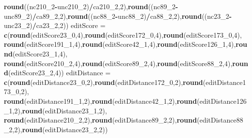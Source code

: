 \documentclass[
]{article}
\newenvironment{Shaded}{\begin{snugshade}}{\end{snugshade}}
\newcommand{\DecValTok}[1]{\textcolor[rgb]{0.00,0.00,0.81}{#1}}
\newcommand{\KeywordTok}[1]{\textcolor[rgb]{0.13,0.29,0.53}{\textbf{#1}}}
\newcommand{\NormalTok}[1]{#1}
\newcommand{\OperatorTok}[1]{\textcolor[rgb]{0.81,0.36,0.00}{\textbf{#1}}}
\newcommand{\StringTok}[1]{\textcolor[rgb]{0.31,0.60,0.02}{#1}}
\begin{document}
\begin{Shaded}
\begin{Highlighting}[]
          \KeywordTok{round}\NormalTok{((nc210_}\DecValTok{2}\OperatorTok{-}\NormalTok{unc210_}\DecValTok{2}\NormalTok{)}\OperatorTok{/}\NormalTok{ca210_}\DecValTok{2}\NormalTok{,}\DecValTok{2}\NormalTok{),}\KeywordTok{round}\NormalTok{((nc89_}\DecValTok{2}\OperatorTok{-}\NormalTok{unc89_}\DecValTok{2}\NormalTok{)}\OperatorTok{/}\NormalTok{ca89_}\DecValTok{2}\NormalTok{,}\DecValTok{2}\NormalTok{),}\KeywordTok{round}\NormalTok{((nc88_}\DecValTok{2}\OperatorTok{-}\NormalTok{unc88_}\DecValTok{2}\NormalTok{)}\OperatorTok{/}\NormalTok{ca88_}\DecValTok{2}\NormalTok{,}\DecValTok{2}\NormalTok{),}\KeywordTok{round}\NormalTok{((nc23_}\DecValTok{2}\OperatorTok{-}\NormalTok{unc23_}\DecValTok{2}\NormalTok{)}\OperatorTok{/}\NormalTok{ca23_}\DecValTok{2}\NormalTok{,}\DecValTok{2}\NormalTok{))}
\NormalTok{editScore =}\StringTok{ }\KeywordTok{c}\NormalTok{(}\KeywordTok{round}\NormalTok{(editScore23_}\DecValTok{0}\NormalTok{,}\DecValTok{4}\NormalTok{),}\KeywordTok{round}\NormalTok{(editScore172_}\DecValTok{0}\NormalTok{,}\DecValTok{4}\NormalTok{),}\KeywordTok{round}\NormalTok{(editScore173_}\DecValTok{0}\NormalTok{,}\DecValTok{4}\NormalTok{),}
            \KeywordTok{round}\NormalTok{(editScore191_}\DecValTok{1}\NormalTok{,}\DecValTok{4}\NormalTok{),}\KeywordTok{round}\NormalTok{(editScore42_}\DecValTok{1}\NormalTok{,}\DecValTok{4}\NormalTok{),}\KeywordTok{round}\NormalTok{(editScore126_}\DecValTok{1}\NormalTok{,}\DecValTok{4}\NormalTok{),}\KeywordTok{round}\NormalTok{(editScore23_}\DecValTok{1}\NormalTok{,}\DecValTok{4}\NormalTok{),}
            \KeywordTok{round}\NormalTok{(editScore210_}\DecValTok{2}\NormalTok{,}\DecValTok{4}\NormalTok{),}\KeywordTok{round}\NormalTok{(editScore89_}\DecValTok{2}\NormalTok{,}\DecValTok{4}\NormalTok{),}\KeywordTok{round}\NormalTok{(editScore88_}\DecValTok{2}\NormalTok{,}\DecValTok{4}\NormalTok{),}\KeywordTok{round}\NormalTok{(editScore23_}\DecValTok{2}\NormalTok{,}\DecValTok{4}\NormalTok{))}
\NormalTok{editDistance =}\StringTok{ }\KeywordTok{c}\NormalTok{(}\KeywordTok{round}\NormalTok{(editDistance23_}\DecValTok{0}\NormalTok{,}\DecValTok{2}\NormalTok{),}\KeywordTok{round}\NormalTok{(editDistance172_}\DecValTok{0}\NormalTok{,}\DecValTok{2}\NormalTok{),}\KeywordTok{round}\NormalTok{(editDistance173_}\DecValTok{0}\NormalTok{,}\DecValTok{2}\NormalTok{),}
            \KeywordTok{round}\NormalTok{(editDistance191_}\DecValTok{1}\NormalTok{,}\DecValTok{2}\NormalTok{),}\KeywordTok{round}\NormalTok{(editDistance42_}\DecValTok{1}\NormalTok{,}\DecValTok{2}\NormalTok{),}\KeywordTok{round}\NormalTok{(editDistance126_}\DecValTok{1}\NormalTok{,}\DecValTok{2}\NormalTok{),}\KeywordTok{round}\NormalTok{(editDistance23_}\DecValTok{1}\NormalTok{,}\DecValTok{2}\NormalTok{),}
            \KeywordTok{round}\NormalTok{(editDistance210_}\DecValTok{2}\NormalTok{,}\DecValTok{2}\NormalTok{),}\KeywordTok{round}\NormalTok{(editDistance89_}\DecValTok{2}\NormalTok{,}\DecValTok{2}\NormalTok{),}\KeywordTok{round}\NormalTok{(editDistance88_}\DecValTok{2}\NormalTok{,}\DecValTok{2}\NormalTok{),}\KeywordTok{round}\NormalTok{(editDistance23_}\DecValTok{2}\NormalTok{,}\DecValTok{2}\NormalTok{))}


\end{Highlighting}
\end{Shaded}
\end{document}

